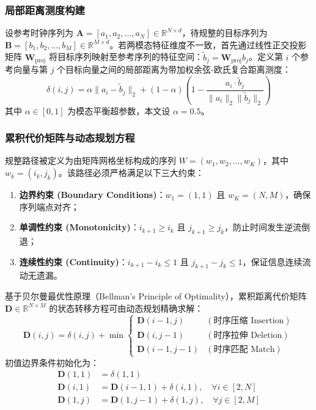 \subsubsection{局部距离测度构建}
设参考时钟序列为 $\mathbf{A} = [a_1, a_2, \dots, a_N] \in \mathbb{R}^{N \times d}$，待规整的目标序列为 $\mathbf{B} = [b_1, b_2, \dots, b_M] \in \mathbb{R}^{M \times d}$。若两模态特征维度不一致，首先通过线性正交投影矩阵 $\mathbf{W}_{\text{proj}}$ 将目标序列映射至参考序列的特征空间：$\tilde{b}_j = \mathbf{W}_{\text{proj}} b_j$。定义第 $i$ 个参考向量与第 $j$ 个目标向量之间的局部距离为带加权余弦-欧氏复合距离测度：
\begin{equation}
\delta(i, j) = \alpha \|a_i - \tilde{b}_j\|_2 + (1 - \alpha) \left( 1 - \frac{a_i \cdot \tilde{b}_j}{\|a_i\|_2 \|\tilde{b}_j\|_2} \right)
\end{equation}
其中 $\alpha \in [0, 1]$ 为模态平衡超参数，本文设 $\alpha = 0.5$。

\subsubsection{累积代价矩阵与动态规划方程}
规整路径被定义为由矩阵网格坐标构成的序列 $W = (w_1, w_2, \dots, w_K)$，其中 $w_k = (i_k, j_k)$。该路径必须严格满足以下三大约束：
\begin{enumerate}
    \item \textbf{边界约束 (Boundary Conditions)}：$w_1 = (1, 1)$ 且 $w_K = (N, M)$，确保序列端点对齐；
    \item \textbf{单调性约束 (Monotonicity)}：$i_{k+1} \ge i_k$ 且 $j_{k+1} \ge j_k$，防止时间发生逆流倒退；
    \item \textbf{连续性约束 (Continuity)}：$i_{k+1} - i_k \le 1$ 且 $j_{k+1} - j_k \le 1$，保证信息连续流动无遗漏。
\end{enumerate}

基于贝尔曼最优性原理（Bellman's Principle of Optimality），累积距离代价矩阵 $\mathbf{D} \in \mathbb{R}^{N \times M}$ 的状态转移方程可由动态规划精确求解：
\begin{equation}
\mathbf{D}(i, j) = \delta(i, j) + \min \begin{cases}
\mathbf{D}(i-1, j) & (\text{时序压缩 Insertion}) \\
\mathbf{D}(i, j-1) & (\text{时序拉伸 Deletion}) \\
\mathbf{D}(i-1, j-1) & (\text{时序匹配 Match})
\end{cases}
\end{equation}
初值边界条件初始化为：
\begin{align}
\mathbf{D}(1, 1) &= \delta(1, 1) \\
\mathbf{D}(i, 1) &= \mathbf{D}(i-1, 1) + \delta(i, 1), \quad \forall i \in [2, N] \\
\mathbf{D}(1, j) &= \mathbf{D}(1, j-1) + \delta(1, j), \quad \forall j \in [2, M]
\end{align}

